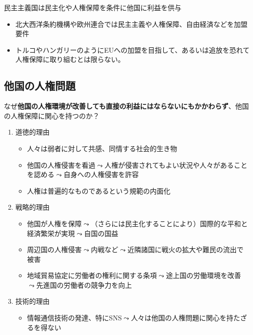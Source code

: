 \documentclass[
  xelatex,
  ja=standard]{bxjsarticle}
\providecommand{\tightlist}{%
  \setlength{\itemsep}{0pt}\setlength{\parskip}{0pt}}\usepackage{longtable,booktabs,array}
\begin{document}
民主主義国は民主化や人権保障を条件に他国に利益を供与

\begin{itemize}
\tightlist
\item
  北大西洋条約機構や欧州連合では民主主義や人権保障、自由経済などを加盟要件
\item
  トルコやハンガリーのようにEUへの加盟を目指して、あるいは追放を恐れて人権保障に取り組むとは限らない。
\end{itemize}

\hypertarget{ux4ed6ux56fdux306eux4ebaux6a29ux554fux984c}{%
\subsection{他国の人権問題}\label{ux4ed6ux56fdux306eux4ebaux6a29ux554fux984c}}

なぜ\textbf{他国の人権環境が改善しても直接の利益にはならないにもかかわらず}、他国の人権保障に関心を持つのか？

\begin{enumerate}
\def\labelenumi{\arabic{enumi}.}
\tightlist
\item
  道徳的理由

  \begin{itemize}
  \tightlist
  \item
    人々は弱者に対して共感、同情する社会的生き物
  \item
    他国の人権侵害を看過\(\leadsto\)人権が侵害されてもよい状況や人々があることを認める\(\leadsto\)自身への人権侵害を許容
  \item
    人権は普遍的なものであるという規範の内面化
  \end{itemize}
\item
  戦略的理由

  \begin{itemize}
  \tightlist
  \item
    他国が人権を保障\(\leadsto\)（さらには民主化することにより）国際的な平和と経済繁栄が実現\(\leadsto\)自国の国益
  \item
    周辺国の人権侵害\(\leadsto\)内戦など\(\leadsto\)近隣諸国に戦火の拡大や難民の流出で被害
  \item
    地域貿易協定に労働者の権利に関する条項\(\leadsto\)途上国の労働環境を改善\(\leadsto\)先進国の労働者の競争力を向上\citep{hafner2005}
  \end{itemize}
\item
  技術的理由

  \begin{itemize}
  \tightlist
  \item
    情報通信技術の発達、特にSNS\(\leadsto\)人々は他国の人権問題に関心を持たざるを得ない
  \end{itemize}
\end{enumerate}
\end{document}

